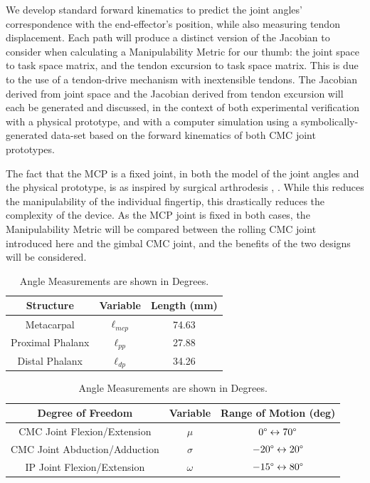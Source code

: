 \documentclass[journal]{IEEEtran}
\begin{document}
We develop standard forward kinematics to predict the joint angles' correspondence with the end-effector's position, while also measuring tendon displacement. Each path will produce a distinct version of the Jacobian to consider when calculating a Manipulability Metric for our thumb: the joint space to task space matrix, and the tendon excursion to task space matrix. This is due to the use of a tendon-drive mechanism with inextensible tendons. The Jacobian derived from joint space and the Jacobian derived from tendon excursion will each be generated and discussed, in the context of both experimental verification with a physical prototype, and with a computer simulation using a symbolically-generated data-set based on the forward kinematics of both CMC joint prototypes. %

The fact that the MCP is a fixed joint, in both the model of the joint angles and the physical prototype, is as inspired by surgical arthrodesis \cite{Pulleyking}, \cite{Pulleyking-Schultz}. While this reduces the manipulability of the individual fingertip, this drastically reduces the complexity of the device. As the MCP joint is fixed in both cases, the Manipulability Metric will be compared between the rolling CMC joint introduced here and the gimbal CMC joint, and the benefits of the two designs will be considered.

\begin{table}
 \centering
 \caption{Angle Measurements are shown in Degrees.}
 \begin{tabular}{c|c|c}
	Structure & Variable & Length (mm) \\
	\hline
	Metacarpal & $\ell_{mcp}$ & 74.63 \\
	Proximal Phalanx & $\ell_{pp}$ & 27.88 \\
	Distal Phalanx & $\ell_{dp}$ & 34.26 \\
	\hline
	\hline
	\end{tabular}
 \begin{tabular}{c|c|c}
 Degree of Freedom & Variable & Range of Motion (deg)\\
	\hline
	CMC Joint Flexion/Extension & $\mu$ & $0\degree\leftrightarrow70\degree$\\
	CMC Joint Abduction/Adduction & $\sigma$ & $-20\degree\leftrightarrow20\degree$\\
	IP Joint Flexion/Extension & $\omega$ & $-15\degree\leftrightarrow80\degree$\\
	\hline
	\hline
	\end{tabular}
 \label{jointdegrees}
\end{table}
\end{document}

